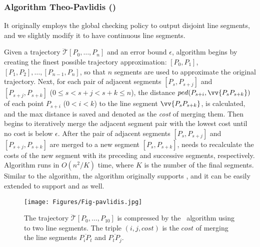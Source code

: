 \subsubsection{Algorithm Theo-Pavlidis  (\tpa) ~\cite{Pavlidis:Segment}}
It originally employs the global checking policy to output disjoint line segments, and we slightly modify it to have continuous line segments.

Given a trajectory $\dddot{\mathcal{T}}[P_0, \ldots, P_n]$ and an error bound $\epsilon$,
algorithm \tpa begins by creating the finest possible  trajectory approximation: $[P_0, P_1]$, $[P_1, P_2], \ldots,[P_{n-1}, P_n]$, so that $n$ segments are used to approximate the original trajectory.
Next, for each pair of adjacent segments $[P_{s}, P_{s+j}]$ and $[P_{s+j}, P_{s+k}]$ ($0\le s<s+j < s+k \le n$),
the  distance $ped(P_{s+i}, \vv{P_sP_{s+k}})$ of each point $P_{s+i}$ ($0<i<k$) to the line segment $\vv{P_sP_{s+k}}$, is calculated, and the max distance is saved and denoted as the \emph{cost} of merging them.
Then \tpa begins to iteratively merge the adjacent segment pair with the lowest cost
until no cost is below $\epsilon$.
After the pair of adjacent segments $[P_{s}, P_{s+j}]$ and $[P_{s+j}, P_{s+k}]$ are merged to a new segment $[P_{s}, P_{s+k}]$, \tpa needs to recalculate the costs of the new segment with its preceding and successive segments, respectively.
%
Algorithm \tpa runs in $O(n^2/K)$ time, where $K$ is the number of the final segments.
Similar to the \dpa algorithm, the \tpa algorithm originally supports \ped, and it can be easily extended to support \sed and \dad as well.

\begin{figure}[tb!]
	\centering
	\texttt{[image: Figures/Fig-pavlidis.jpg]}\vspace{-1ex}
	\caption{\small The trajectory $\dddot{\mathcal{T}}[P_0, \ldots, P_{10}]$ is compressed by the \pavlidis~algorithm using \ped to two line segments. The triple $(i, j, cost)$ is the $cost$ of merging the line segments $\overline{P_iP_t}$ and $\overline{P_tP_j}$.}	\vspace{-2ex}
	\label{fig:pavlidis}
\end{figure}

